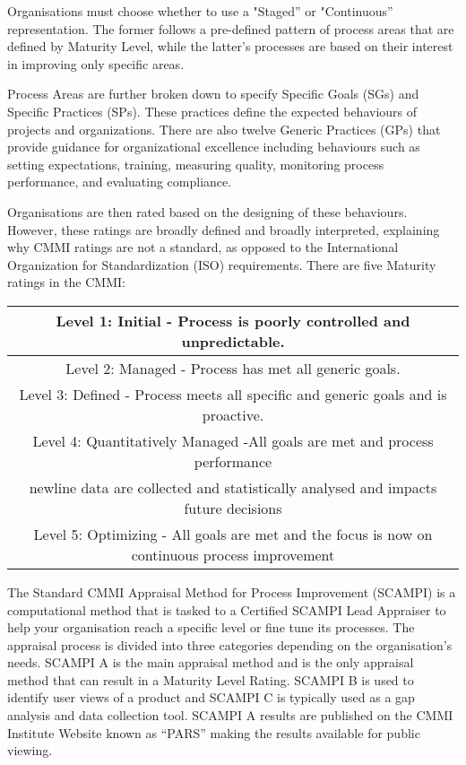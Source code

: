 \documentclass{article}
\begin{document}
Organisations must choose whether to use a "Staged'' or "Continuous'' representation. The former follows a pre-defined pattern of process areas that are defined by Maturity Level, while the latter’s processes are based on their interest in improving only specific areas. \newline

Process Areas are further broken down to specify Specific Goals (SGs) and Specific Practices (SPs). These practices define the expected behaviours of projects and organizations. There are also twelve Generic Practices (GPs) that provide guidance for organizational excellence including behaviours such as setting expectations, training, measuring quality, monitoring process performance, and evaluating compliance. \cite{cmmi} \newline

Organisations are then rated based on the designing of these behaviours. However, these ratings are broadly defined and broadly interpreted, explaining why CMMI ratings are not a standard, as opposed to the International Organization for Standardization (ISO) requirements. There are five Maturity ratings in the CMMI:

\begin{center}
\begin{tabular}{||c||} 
\hline
Level 1: Initial - Process is poorly controlled and unpredictable.\\ 
\hline
Level 2: Managed - Process has met all generic goals. \\ 
\hline
Level 3: Defined - Process meets all specific and generic goals and is proactive. \\
\hline
Level 4: Quantitatively Managed -All goals are met and process performance\\newline data are collected and statistically analysed and impacts future decisions \\
\hline
Level 5: Optimizing - All goals are met and the focus is now on continuous process improvement \\
\hline
\end{tabular}
\end{center}

The Standard CMMI Appraisal Method for Process Improvement (SCAMPI) is a computational method that is tasked to a Certified SCAMPI Lead Appraiser to help your organisation reach a specific level or fine tune its processes. The appraisal process is divided into three categories depending on the organisation's needs. SCAMPI A is the main appraisal method and is the only appraisal method that can result in a Maturity Level Rating. SCAMPI B is used to identify user views of a product and SCAMPI C is typically used as a gap analysis and data collection tool. SCAMPI A results are published on the CMMI Institute Website known as “PARS” making the results available for public viewing. \cite{cmmi} \newline
\end{document}
